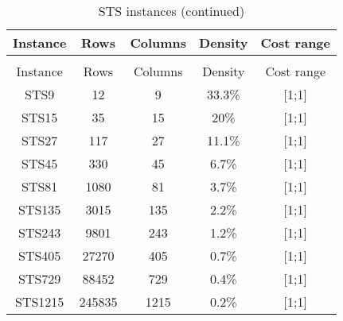 \begin{longtable}{ccccc}
	\caption{STS instances}\\
	\toprule
	Instance & Rows & Columns & Density & Cost range\\
	\midrule
	\endfirsthead
	\caption{STS instances (continued)}\\
	\toprule
	Instance & Rows & Columns & Density & Cost range\\
	\midrule
	\endhead
	\bottomrule
	\endfoot
	STS9 & 12 & 9 & 33.3\% & [1;1]\\
	STS15 & 35 & 15 & 20\% & [1;1]\\
	STS27 & 117 & 27 & 11.1\% & [1;1]\\
	STS45 & 330 & 45 & 6.7\% & [1;1]\\
	STS81 & 1080 & 81 & 3.7\% & [1;1]\\
	STS135 & 3015 & 135 & 2.2\% & [1;1]\\
	STS243 & 9801 & 243 & 1.2\% & [1;1]\\
	STS405 & 27270 & 405 & 0.7\% & [1;1]\\
	STS729 & 88452 & 729 & 0.4\% & [1;1]\\
	STS1215 & 245835 & 1215 & 0.2\% & [1;1]\\
\end{longtable}
